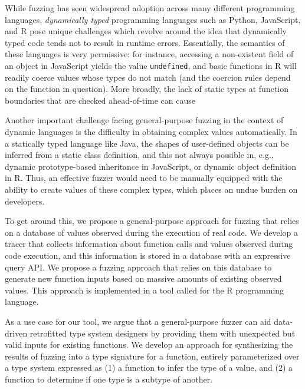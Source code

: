 \documentclass[sigplan,anonymous,review]{acmart}
\begin{document}
While fuzzing has seen widespread adoption across many different programming languages, \textit{dynamically typed} programming languages such as Python, JavaScript, and R pose unique challenges which revolve around the idea that dynamically typed code tends not to result in runtime errors.
Essentially, the semantics of these languages is very permissive: for instance, accessing a non-existent field of an object in JavaScript yields the value {\tt undefined}, and basic functions in R will readily coerce values whose types do not match (and the coercion rules depend on the function in question).
More broadly, the lack of static types at function boundaries that are checked ahead-of-time can cause \AT{\ldots}

Another important challenge facing general-purpose fuzzing in the context of dynamic languages is the difficulty in obtaining complex values automatically.
In a statically typed language like Java, the shapes of user-defined objects can be inferred from a static class definition, and this not always possible in, e.g., dynamic prototype-based inheritance in JavaScript, or dynamic object definition in R.
Thus, an effective fuzzer would need to be manually equipped with the ability to create values of these complex types, which places an undue burden on developers.

To get around this, we propose a general-purpose approach for fuzzing that relies on a database of values observed during the execution of real code.
We develop a tracer that collects information about function calls and values observed during code execution, and this information is stored in a database with an expressive query API.
We propose a fuzzing approach that relies on this database to generate new function inputs based on massive amounts of existing observed values.
This approach is implemented in a tool called \tool for the R programming language.

As a use case for our tool, we argue that a general-purpose fuzzer can aid data-driven retrofitted type system designers by providing them with unexpected but valid inputs for existing functions.
We develop an approach for synthesizing the results of fuzzing into a type signature for a function, entirely parameterized over a type system expressed as (1) a function to infer the type of a value, and (2) a function to determine if one type is a subtype of another.
\end{document}
